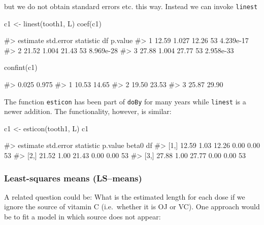 but we do not obtain standard errors etc. this way. Instead we can
invoke \texttt{linest}

\begin{Schunk}
\begin{Sinput}
c1 <- linest(tooth1, L)
coef(c1)
\end{Sinput}
\begin{Soutput}
#>   estimate std.error statistic df   p.value
#> 1    12.59     1.027     12.26 53 4.239e-17
#> 2    21.52     1.004     21.43 53 8.969e-28
#> 3    27.88     1.004     27.77 53 2.958e-33
\end{Soutput}
\begin{Sinput}
confint(c1)
\end{Sinput}
\begin{Soutput}
#>   0.025 0.975
#> 1 10.53 14.65
#> 2 19.50 23.53
#> 3 25.87 29.90
\end{Soutput}
\end{Schunk}

The function \texttt{esticon} has been part of \texttt{doBy} for many
years while \texttt{linest} is a newer addition. The functionality,
however, is similar:

\begin{Schunk}
\begin{Sinput}
c1 <- esticon(tooth1, L)
c1
\end{Sinput}
\begin{Soutput}
#>      estimate std.error statistic p.value beta0 df
#> [1,]    12.59      1.03     12.26    0.00  0.00 53
#> [2,]    21.52      1.00     21.43    0.00  0.00 53
#> [3,]    27.88      1.00     27.77    0.00  0.00 53
\end{Soutput}
\end{Schunk}

\hypertarget{least-squares-means-lsmeans}{%
\subsubsection{Least-squares means
(LS--means)}\label{least-squares-means-lsmeans}}

A related question could be: What is the estimated length for each dose
if we ignore the source of vitamin C (i.e.~whether it is OJ or VC). One
approach would be to fit a model in which source does not appear:

